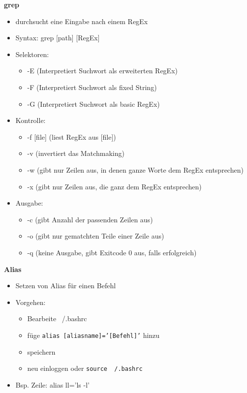 \documentclass[12pt,utf8, 10pt]{article}
\begin{document}
\textbf{grep}
\begin{itemize}
	\item durchsucht eine Eingabe nach einem RegEx
	\item Syntax: grep [path] [RegEx]
	\item Selektoren:
	\begin{itemize}
		\item -E (Interpretiert Suchwort als erweiterten RegEx)
		\item -F (Interpretiert Suchwort als fixed String)
		\item -G (Interpretiert Suchwort als basic RegEx)
	\end{itemize}
	\item Kontrolle:
	\begin{itemize}
		\item -f [file] (liest RegEx aus [file])
		\item -v (invertiert das Matchmaking)
		\item -w (gibt nur Zeilen aus, in denen ganze Worte dem RegEx entsprechen)
		\item -x (gibt nur Zeilen aus, die ganz dem RegEx entsprechen)
	\end{itemize}
	\item Ausgabe:
	\begin{itemize}
		\item -c (gibt Anzahl der passenden Zeilen aus)
		\item -o (gibt nur gematchten Teile einer Zeile aus)
		\item -q (keine Ausgabe, gibt Exitcode 0 aus, falls erfolgreich)
	\end{itemize}
\end{itemize}

\textbf{Alias}
\begin{itemize}
	\item Setzen von Alias für einen Befehl
	\item Vorgehen:
	\begin{itemize}
		\item Bearbeite ~/.bashrc
		\item füge \texttt{alias [aliasname]='[Befehl]'} hinzu
		\item speichern
		\item neu einloggen oder \texttt{source ~/.bashrc}
	\end{itemize}
	\item Bsp. Zeile: alias ll='ls -l'
\end{itemize}
\end{document}
